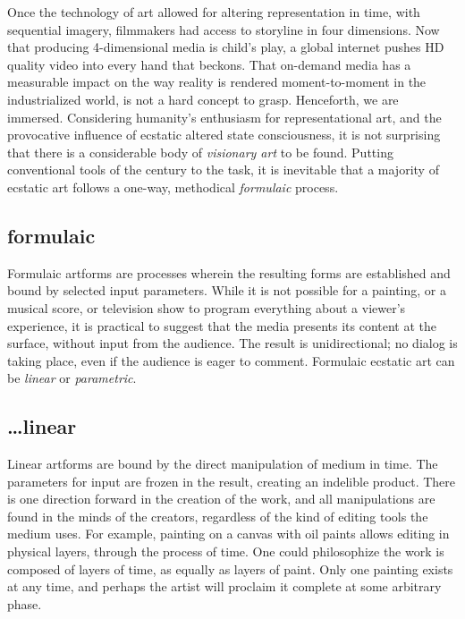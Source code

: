 \documentclass{UIdahoMastersThesis}
\begin{document}
Once the technology of art allowed for altering representation in time, with sequential imagery, filmmakers had access to storyline in four dimensions. Now that producing 4-dimensional media is child's play, a global internet pushes HD quality video into every hand that beckons. That on-demand media has a measurable impact on the way reality is rendered moment-to-moment in the industrialized world, is not a hard concept to grasp. Henceforth, we are immersed.
Considering humanity's enthusiasm for representational art, and the provocative influence of ecstatic altered state consciousness, it is not surprising that there is a considerable body of \emph{visionary art} to be found. Putting conventional tools of the  century to the task, it is inevitable that a majority of ecstatic art follows a one-way, methodical \emph{formulaic} process. 


\subsection{formulaic}

Formulaic artforms are processes wherein the resulting forms are established and bound by selected input parameters. While it is not possible for a painting, or a musical score, or television show to program everything about a viewer's experience, it is practical to suggest that the media presents its content at the surface, without input from the audience. The result is unidirectional; no dialog is taking place, even if the audience is eager to comment.
Formulaic ecstatic art can be \emph{linear} or \emph{parametric}.

\subsection*{\ldots linear}

Linear artforms are bound by the direct manipulation of medium in time. The parameters for input are frozen in the result, creating an indelible product. There is one direction forward in the creation of the work, and all manipulations are found in the minds of the creators, regardless of the kind of editing tools the medium uses. For example, painting on a canvas with oil paints allows editing in physical layers, through the process of time. One could philosophize the work is composed of layers of time, as equally as layers of paint. Only one painting exists at any time, and perhaps the artist will proclaim it complete at some arbitrary phase. 
\end{document}
